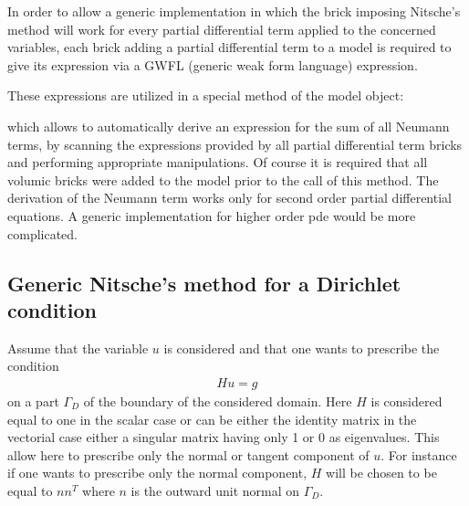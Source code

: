 \documentclass[a4paper,11pt,english]{sphinxmanual}
\begin{document}
In order to allow a generic implementation in which the brick imposing Nitsche’s method will work for every partial differential term applied to the concerned variables, each brick adding a partial differential term to a model is required to give its expression via a GWFL (generic weak form language) expression.

These expressions are utilized in a special method of the model object:

\begin{sphinxVerbatim}[commandchars=\\\{\}]
   
\end{sphinxVerbatim}

which allows to automatically derive an expression for the sum of all Neumann terms, by scanning the expressions provided by all partial differential term bricks and performing appropriate manipulations.
Of course it is required that all volumic bricks were added to the model prior to the call of this method.
The derivation of the Neumann term works only for second order partial differential equations.
A generic implementation for higher order pde would be more complicated.


\subsection{Generic Nitsche’s method for a Dirichlet condition}
\label{\detokenize{userdoc/model_Nitsche:generic-nitsche-s-method-for-a-dirichlet-condition}}
Assume that the variable \(u\) is considered and that one wants to prescribe the condition
\begin{equation*}
\begin{split}Hu = g\end{split}
\end{equation*}
on a part \(\Gamma_D\)  of the boundary of the considered domain.
Here \(H\) is considered equal to one in the scalar case or can be either the identity matrix in the vectorial case either a singular matrix having only 1 or 0 as eigenvalues.
This allow here to prescribe only the normal or tangent component of \(u\).
For instance if one wants to prescribe only the normal component, \(H\) will be chosen to be equal to \(nn^T\) where \(n\) is the outward unit normal on \(\Gamma_D\).
\end{document}
